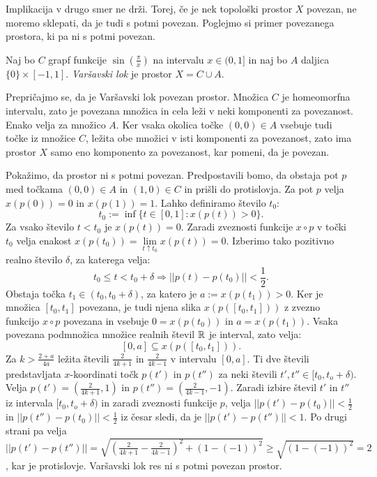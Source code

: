 \documentclass[../TG_magistrsko_delo_sections.tex]{subfiles}
\begin{document}
Implikacija v drugo smer ne drži. Torej, če je nek topološki prostor $X$ povezan, ne moremo sklepati, da je tudi s potmi povezan. Poglejmo si primer povezanega prostora, ki pa ni s potmi povezan.

\begin{definicija}
Naj bo $C$ grapf funkcije $\sin\left(\frac{\pi}{x}\right)$ na intervalu $x \in (0 , 1]$ in naj bo $A$ daljica $\{ 0 \} \times [-1 , 1]$. \emph{Varšavski lok} je prostor $X = C \cup A$.
\end{definicija}

Prepričajmo se, da je Varšavski lok povezan prostor. Množica $C$ je homeomorfna intervalu, zato je povezana množica in cela leži v neki komponenti za povezanost. Enako velja za množico $A$. Ker vsaka okolica točke $(0, 0) \in A$ vsebuje tudi točke iz množice $C$, ležita obe množici v isti komponenti za povezanost, zato ima prostor $X$ samo eno komponento za povezanost, kar pomeni, da je povezan.

Pokažimo, da prostor ni s potmi povezan. Predpostavili bomo, da obstaja pot $p$ med točkama $(0, 0) \in A$ in $(1, 0) \in C$ in prišli do protislovja. Za pot $p$ velja $x(p(0)) = 0$ in $x(p(1)) = 1$. Lahko definiramo število $t_0$:
$$t_0 := \inf\{t \in [0, 1]: x(p(t)) > 0 \}.$$
Za vsako število $t <t_0$ je $x(p(t)) = 0$. Zaradi zveznosti funkcije $x \circ p$ v točki $t_0$ velja enakost $x(p(t_0)) = \lim\limits_{t \uparrow t_0} x(p(t)) = 0$. Izberimo tako pozitivno realno število $\delta$, za katerega velja:
$$t_0 \leq t < t_0 + \delta \Rightarrow ||p(t) - p(t_0)|| < \frac{1}{2}.$$
Obstaja točka $t_1 \in (t_0, t_0 + \delta)$, za katero je $a := x(p(t_1)) >0$. Ker je množica $[t_0, t_1]$ povezana, je tudi njena slika $x(p([t_0, t_1]))$ z zvezno funkcijo $x \circ p$ povezana in vsebuje $0 = x(p(t_0))$ in $a = x(p(t_1))$. Vsaka povezana podmnožica množice realnih števil $\mathbb R$ je interval, zato velja:
$$[0, a] \subseteq x(p([t_0, t_1])).$$
Za $k > \frac{2+a}{4a}$ ležita števili $\frac{2}{4k+1}$ in $\frac{2}{4k-1}$ v intervalu $[0, a]$. Ti dve števili predstavljata $x$-koordinati točk $p(t')$ in $p(t'')$ za neki števili $t', t'' \in [t_0, t_o + \delta)$. Velja $p(t') = (\frac{2}{4k+1}, 1)$ in $p(t'') = (\frac{2}{4k-1}, -1)$. Zaradi izbire števil $t'$ in $t''$ iz intervala $[t_0, t_o + \delta)$ in zaradi zveznosti funkcije $p$, velja $||p(t') - p(t_0)||< \frac{1}{2}$ in $||p(t'') - p(t_0)||< \frac{1}{2}$ iz česar sledi, da je $||p(t') - p(t'')||< 1$. Po drugi strani pa velja $||p(t') - p(t'')|| = \sqrt{\left(\frac{2}{4k+1}-\frac{2}{4k-1}\right)^2 + (1-(-1))^2} \geq \sqrt{(1-(-1))^2} = 2$, kar je protislovje. Varšavski lok res ni s potmi povezan prostor.
\end{document}
